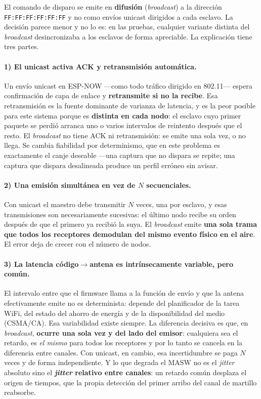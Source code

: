 El comando de disparo se emite en \textbf{difusi\'on} (\emph{broadcast}) a la direcci\'on
\texttt{FF:FF:FF:FF:FF:FF} y no como env\'ios unicast dirigidos a cada esclavo. La
decisi\'on parece menor y no lo es: en las pruebas, cualquier variante distinta del
\emph{broadcast} desincronizaba a los esclavos de forma apreciable. La explicaci\'on
tiene tres partes.

\paragraph{1) El unicast activa ACK y retransmisi\'on autom\'atica.} Un env\'io unicast en
ESP-NOW ---como todo tr\'afico dirigido en 802.11--- espera confirmaci\'on de capa de
enlace y \textbf{retransmite si no la recibe}. Esa retransmisi\'on es la fuente dominante
de varianza de latencia, y es la peor posible para este sistema porque es
\textbf{distinta en cada nodo}: el esclavo cuyo primer paquete se perdi\'o arranca uno o
varios intervalos de reintento despu\'es que el resto. El \emph{broadcast} no tiene ACK ni
retransmisi\'on: se emite una sola vez, o no llega. Se cambia fiabilidad por
determinismo, que en este problema es exactamente el canje deseable ---una captura que no
dispara se repite; una captura que dispara desalineada produce un perfil err\'oneo sin
avisar.

\paragraph{2) Una emisi\'on simult\'anea en vez de $N$ secuenciales.} Con unicast el
maestro debe transmitir $N$ veces, una por esclavo, y esas transmisiones son
necesariamente sucesivas: el \'ultimo nodo recibe su orden despu\'es de que el primero ya
recibi\'o la suya. El \emph{broadcast} emite \textbf{una sola trama que todos los
receptores demodulan del mismo evento f\'isico en el aire}. El error deja de crecer con
el n\'umero de nodos.

\paragraph{3) La latencia c\'odigo$\to$antena es intr\'insecamente variable, pero
com\'un.} El intervalo entre que el firmware llama a la funci\'on de env\'io y que la
antena efectivamente emite no es determinista: depende del planificador de la tarea WiFi,
del estado del ahorro de energ\'ia y de la disponibilidad del medio (CSMA/CA). Esa
variabilidad existe siempre. La diferencia decisiva es que, en \emph{broadcast},
\textbf{ocurre una sola vez y del lado del emisor}: cualquiera sea el retardo, es
\emph{el mismo} para todos los receptores y por lo tanto se cancela en la diferencia
entre canales. Con unicast, en cambio, esa incertidumbre se paga $N$ veces y de forma
independiente. Y lo que degrada el MASW no es el \emph{jitter} absoluto sino el
\textbf{\emph{jitter} relativo entre canales}: un retardo com\'un desplaza el origen de
tiempos, que la propia detecci\'on del primer arribo del canal de martillo reabsorbe.

